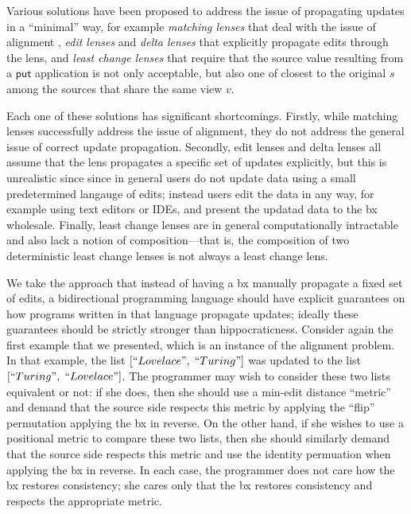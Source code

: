 \documentclass[acmsmall,review,anonymous]{acmart}\settopmatter{printfolios=true,printccs=false,printacmref=false}
\theoremstyle{definition}
\newcommand{\kw}[1]{\ensuremath{\mathsf{#1}}\xspace}
\newcommand{\pput}{\ensuremath{\kw{put}}\xspace}
\begin{document}
Various solutions have been proposed to address the issue of propagating updates in a ``minimal'' way, for example {\em matching lenses} that deal with the issue of alignment \cite{barbosa2010matching}, {\em edit lenses} \cite{hofmann2012edit} and {\em delta lenses} \cite{diskin2011asymmetric,diskin2011state,pacheco2012delta}
that explicitly propagate edits through the lens, and {\em least change
lenses} \cite{macedo2013composing} that require that the source value resulting from a \pput application is not only acceptable, but also one of closest to the original $s$ among the sources that share the same view $v$.

Each one of these solutions has significant shortcomings. Firstly, while matching lenses successfully address the issue of alignment, they do not address the general issue of correct update propagation. Secondly, edit lenses and delta lenses all assume that the lens propagates a specific set of updates explicitly, but this is unrealistic since since in general users do not update data using a small predetermined langauge of edits; instead users edit the data in any way, for example using text editors or IDEs, and present the updatad data to the bx wholesale. Finally, least change lenses are in general computationally intractable \cite{buneman2002propagation} and also lack a notion of composition---that is, the composition of two deterministic least change lenses is not always a least change lens\cite{macedo2013composing}.

We take the approach that instead of having a bx manually propagate a fixed set of edits, a bidirectional programming language should have explicit guarantees on how programs written in that language propagate updates; ideally these guarantees should be strictly stronger than hippocraticness. Consider again the first example that we presented, which is an instance of the alignment problem. In that example, the list
$[``Lovelace", \; ``Turing"]$ was updated to the list $[``Turing", \; ``Lovelace"]$. The programmer may wish to consider these two lists equivalent or not: if she does, then she should use a min-edit distance ``metric'' and demand that the source side respects this metric by applying the ``flip'' permutation applying the bx in reverse. On the other hand, if she wishes to use a positional metric to compare these two lists, then she should similarly demand that the source side respects this metric and use the identity permuation when applying the bx in reverse. In each case, the programmer does not care how the bx restores consistency; she cares only that the bx restores consistency and respects the appropriate metric.
\end{document}
